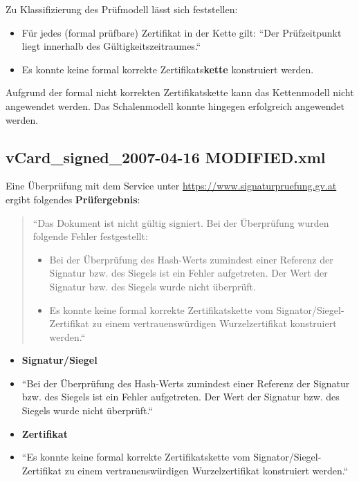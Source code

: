 \noindent
Zu Klassifizierung des Prüfmodell lässt sich feststellen:

\begin{itemize}
    \itemsep0.5em
    \item Für jedes (formal prüfbare) Zertifikat in der Kette gilt: ``Der Prüfzeitpunkt liegt innerhalb des Gültigkeitszeitraumes.``
    \item Es konnte keine formal korrekte Zertifikats\textbf{kette} konstruiert werden.
\end{itemize}

\noindent
Aufgrund der formal nicht korrekten Zertifikatskette kann das Kettenmodell nicht angewendet werden. Das Schalenmodell konnte hingegen erfolgreich angewendet werden.

\subsection*{vCard\_signed\_2007-04-16 MODIFIED.xml}

Eine Überprüfung mit dem Service unter \url{https://www.signaturpruefung.gv.at} ergibt folgendes \textbf{Prüfergebnis}:

\blockquote[]{
    ``Das Dokument ist nicht gültig signiert. Bei der Überprüfung wurden folgende Fehler festgestellt:
    \begin{itemize}
        \item  Bei der Überprüfung des Hash-Werts zumindest einer Referenz der Signatur bzw. des Siegels ist ein Fehler aufgetreten. Der Wert der Signatur bzw. des Siegels wurde nicht überprüft.
        \item  Es konnte keine formal korrekte Zertifikatskette vom Signator/Siegel-Zertifikat zu einem vertrauenswürdigen Wurzelzertifikat konstruiert werden.``
    \end{itemize}
}

\begin{itemize}
    \itemsep0.5em
    \item \textbf{Signatur/Siegel}
    \item[] ``Bei der Überprüfung des Hash-Werts zumindest einer Referenz der Signatur bzw. des Siegels ist ein Fehler aufgetreten. Der Wert der Signatur bzw. des Siegels wurde nicht überprüft.``
    \item \textbf{Zertifikat}
    \item[] ``Es konnte keine formal korrekte Zertifikatskette vom Signator/Siegel-Zertifikat zu einem vertrauenswürdigen Wurzelzertifikat konstruiert werden.``
\end{itemize}

